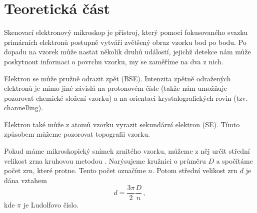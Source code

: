 \section*{Teoretická část}
Skenovací elektronový mikroskop je přístroj, který pomocí fokusovaného svazku primárních elektronů postupně vytváří zvětšený obraz vzorku bod po bodu. Po dopadu na vzorek může nastat několik druhů událostí, jejichž detekce nám může poskytnout informaci o povrchu vzorku, my se zaměříme na dva z nich.

Elektron se může pružně odrazit zpět (BSE). Intenzita zpětně odražených elektronů je mimo jiné závislá na protonovém čísle (takže nám umožňuje pozorovat chemické složení vzorku) a na orientaci krystalografických rovin (tzv. channelling).

Elektron také může z atomů vzorku vyrazit sekundární elektron (SE). Tímto způsobem můžeme pozorovat topografii vzorku.

Pokud máme mikroskopický snímek zrnitého vzorku, můžeme z něj určit střední velikost zrna kruhovou metodou \cite{skripta}. Narýsujeme kružnici o průměru $D$ a spočítáme počet zrn, které protne. Tento počet označíme $n$. Potom střední velikost zrn $d$ je dána vztahem \cite{skripta}
\begin{equation} \label{e:kruhy}
d=\frac{3\pi}{2} \frac{D}{n} \,,
\end{equation}
kde $\pi$ je Ludolfovo číslo.